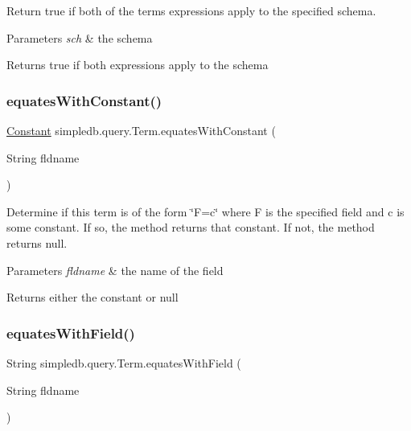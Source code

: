 Return true if both of the term\textquotesingle{}s expressions apply to the specified schema. 
\begin{DoxyParams}{Parameters}
{\em sch} & the schema \\
\hline
\end{DoxyParams}
\begin{DoxyReturn}{Returns}
true if both expressions apply to the schema 
\end{DoxyReturn}
\mbox{\label{classsimpledb_1_1query_1_1Term_ae746c87c9815e12ec762612d6a53ecc4}} 
\subsubsection{\texorpdfstring{equates\+With\+Constant()}{equatesWithConstant()}}
{\footnotesize\ttfamily \hyperlink{classsimpledb_1_1query_1_1Constant}{Constant} simpledb.\+query.\+Term.\+equates\+With\+Constant (\begin{DoxyParamCaption}\item[{String}]{fldname }\end{DoxyParamCaption})\hspace{0.3cm}{\ttfamily [inline]}}

Determine if this term is of the form \char`\"{}\+F=c\char`\"{} where F is the specified field and c is some constant. If so, the method returns that constant. If not, the method returns null. 
\begin{DoxyParams}{Parameters}
{\em fldname} & the name of the field \\
\hline
\end{DoxyParams}
\begin{DoxyReturn}{Returns}
either the constant or null 
\end{DoxyReturn}
\mbox{\label{classsimpledb_1_1query_1_1Term_a744943bf6c77d103c05db6cc0fb29ac5}} 
\subsubsection{\texorpdfstring{equates\+With\+Field()}{equatesWithField()}}
{\footnotesize\ttfamily String simpledb.\+query.\+Term.\+equates\+With\+Field (\begin{DoxyParamCaption}\item[{String}]{fldname }\end{DoxyParamCaption})\hspace{0.3cm}{\ttfamily [inline]}}

